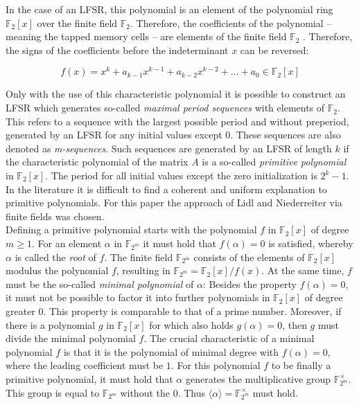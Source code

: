 In the case of an LFSR, this polynomial is an element of the polynomial ring
$\mathbb{F}_2[x]$ over the finite field $\mathbb{F}_2$. Therefore, the coefficients of the polynomial – meaning the tapped memory cells – are elements of the finite field $\mathbb{F}_2$ \cite[pp. 18-19]{Lidl.1997}. Therefore, the signs of the coefficients before the indeterminant $x$ can be reversed:

\begin{equation*}
	f(x)=x^k+a_{k-1}x^{k-1}+a_{k-2}x^{k-2}+\ldots+a_0\in \mathbb{F}_2[x]
\end{equation*}

Only with the use of this characteristic polynomial it is possible to construct an LFSR which generates so-called \textit{maximal period sequences} with elements of $\mathbb{F}_2$. This refers to a sequence with the largest possible period and without preperiod, generated by an LFSR for any initial values except $0$. These sequences are also denoted as \textit{m-sequences}. Such sequences are generated by an LFSR of length $k$ if the characteristic polynomial of the matrix $A$ is a so-called \textit{primitive polynomial} in $\mathbb{F}_2[x]$. The period for all initial values except the zero initialization is $2^{k}-1$. \cite[p. 201]{Lidl.1986} \\

In the literature it is difficult to find a coherent and uniform explanation to primitive polynomials. For this paper the approach of Lidl and Niederreiter via finite fields was chosen.\\

Defining a primitive polynomial starts with the polynomial $f$ in $\mathbb{F}_2[x]$ of degree $m\ge1$. For an element $\alpha$ in $\mathbb{F}_{2^m}$ it must hold that $f(\alpha)=0$ is satisfied, whereby $\alpha$ is called the \textit{root} of $f$. The finite field $\mathbb{F}_{2^m}$ consists of the elements of $\mathbb{F}_2[x]$ modulus the polynomial $f$, resulting in $\mathbb{F}_{2^m}=\mathbb{F}_2[x]/f(x)$. \cite[p. 11]{Smart.2016} At the same time, $f$ must be the so-called \textit{minimal polynomial} of $\alpha$: Besides the property $f(\alpha)=0$, it must not be possible to factor it into further polynomials in $\mathbb{F}_2[x]$ of degree greater $0$. This property is comparable to that of a prime number. Moreover, if there is a polynomial $g$ in $\mathbb{F}_2[x]$ for which also holds $g(\alpha)=0$, then $g$ must divide the minimal polynomial $f$. The crucial characteristic of a minimal polynomial $f$ is that it is the polynomial of minimal degree with $f(\alpha)=0$, where the leading coefficient must be $1$. For this polynomial $f$ to be finally a primitive polynomial, it must hold that $\alpha$ generates the multiplicative group $\mathbb{F}_{2^m}^\times$. This group is equal to $\mathbb{F}_{2^m}$ without the $0$. Thus $\langle\alpha\rangle=\mathbb{F}_{2^m}^\times$ must hold. \cite[pp. 23, 31, 89]{Lidl.1997} \\

